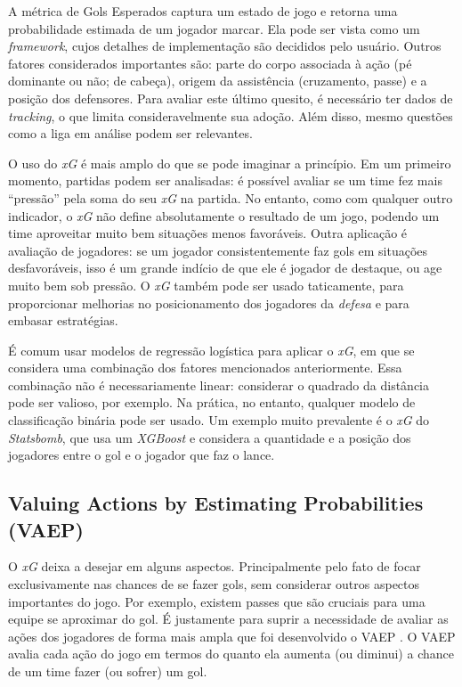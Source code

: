 \documentclass{article}
\begin{document}
A métrica de Gols Esperados captura um estado de jogo e retorna uma
probabilidade estimada de um jogador marcar. Ela pode ser vista como um
\textit{framework}, cujos detalhes de implementação são decididos pelo usuário.
Outros fatores considerados importantes são: parte do corpo associada à ação
(pé dominante ou não; de cabeça), origem da assistência (cruzamento, passe) e a
posição dos defensores. Para avaliar este último quesito, é necessário ter
dados de \textit{tracking}, o que limita consideravelmente sua adoção. Além disso,
mesmo questões como a liga em análise podem ser relevantes.

O uso do \textit{xG} é mais amplo do que se pode imaginar a princípio. Em um
primeiro momento, partidas podem ser analisadas: é possível avaliar se um time
fez mais ``pressão'' pela soma do seu \textit{xG} na partida. No entanto, como
com qualquer outro indicador, o \textit{xG} não define absolutamente o
resultado de um jogo, podendo um time aproveitar muito bem situações menos
favoráveis. Outra aplicação é avaliação de jogadores: se um jogador
consistentemente faz gols em situações desfavoráveis, isso é um grande indício
de que ele é jogador de destaque, ou age muito bem sob pressão. O \textit{xG}
também pode ser usado taticamente, para proporcionar melhorias no
posicionamento dos jogadores da \textit{defesa} e para embasar estratégias.

É comum usar modelos de regressão logística para aplicar o \textit{xG}, em que
se considera uma combinação dos fatores mencionados anteriormente. Essa
combinação não é necessariamente linear: considerar o quadrado da distância
pode ser valioso, por exemplo. Na prática, no entanto, qualquer modelo de
classificação binária pode ser usado. Um exemplo muito prevalente é o
\textit{xG} do \textit{Statsbomb}, que usa um \textit{XGBoost} e considera a
quantidade e a posição dos jogadores entre o gol e o jogador que faz o lance.

\subsection{Valuing Actions by Estimating Probabilities (VAEP)}

O \textit{xG} deixa a desejar em alguns aspectos. Principalmente pelo fato de
focar exclusivamente nas chances de se fazer gols, sem considerar outros
aspectos importantes do jogo. Por exemplo, existem passes que são cruciais para
uma equipe se aproximar do gol. É justamente para suprir a necessidade de
avaliar as ações dos jogadores de forma mais ampla que foi desenvolvido o VAEP
\cite{vaep}. O VAEP avalia cada ação do jogo em termos do quanto ela aumenta (ou
diminui) a chance de um time fazer (ou sofrer) um gol.
\end{document}
